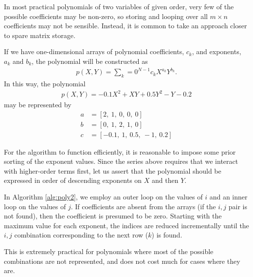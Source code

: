 \documentclass[twocolumn,letterpaper,11pt]{article}
\begin{document}
In most practical polynomials of two variables of given order, very few of the possible coefficients may be non-zero, so storing and looping over all $m\times n$ coefficients may not be sensible.  Instead, it is common to take an approach closer to spare matrix storage.

If we have one-dimensional arrays of polynomial coefficients, $c_k$, and exponents, $a_k$ and $b_k$, the polynomial will be constructed as
\begin{align}
p(X,Y) = \sum_k=0^{N-1} c_k X^{a_k} Y^{b_k}.
\end{align}
In this way, the polynomial
\begin{align}
p(X,Y) = -0.1 X^2 + XY + 0.5 Y^2 - Y - 0.2
\end{align}
may be represented by
\begin{align}
a &= \left[ 2,\ 1,\ 0,\ 0,\ 0\right]\\
b &= \left[ 0,\ 1,\ 2,\ 1,\ 0\right]\\
c &= \left[ -0.1,\ 1,\ 0.5,\ -1,\ 0.2\right]
\end{align}

For the algorithm to function efficiently, it is reasonable to impose some prior sorting of the exponent values.  Since the series above requires that we interact with higher-order terms first, let us assert that the polynomial should be expressed in order of descending exponents on $X$ and then $Y$.

In Algorithm \ref{alg:poly2}, we employ an outer loop on the values of $i$ and an inner loop on the values of $j$.  If coefficients are absent from the arrays (if the $i,j$ pair is not found), then the coefficient is presumed to be zero.  Starting with the maximum value for each exponent, the indices are reduced incrementally until the $i,j$ combination corresponding to the next row ($k$) is found.

This is extremely practical for polynomials where most of the possible combinations are not represented, and does not cost much for cases where they are.
\end{document}
